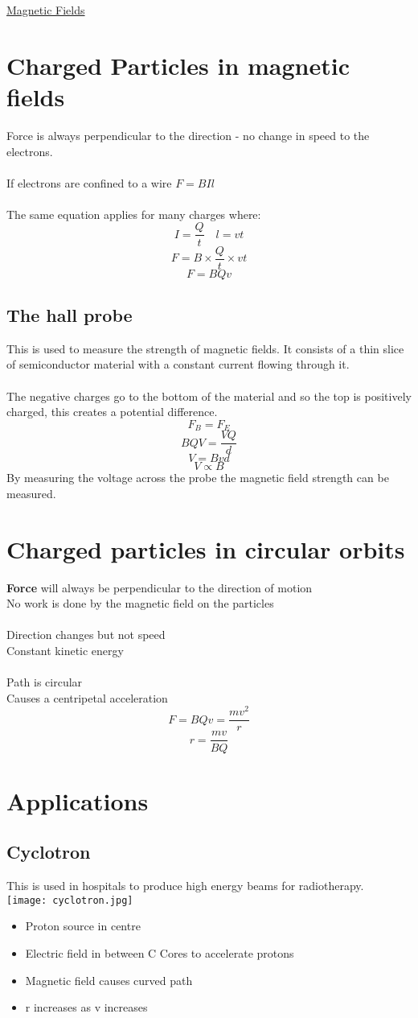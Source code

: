 \documentclass{article}[18pt]
\begin{document}
\begin{center}
\underline{\huge Magnetic Fields}
\end{center}
\section{Charged Particles in magnetic fields}
Force is always perpendicular to the direction - no change in speed to the electrons.\\
\\
If electrons are confined to a wire $F=BIl$\\
\\
The same equation applies for many charges where:
$$I=\frac{Q}{t} \quad l=vt$$
$$F=B\times\frac{Q}{t}\times vt$$
$$F=BQv$$
\subsection{The hall probe}
This is used to measure the strength of magnetic fields. It consists of a thin slice of semiconductor material with a constant current flowing through it.\\
\\
The negative charges go to the bottom of the material and so the top is positively charged, this creates a potential difference.
$$F_B=F_E$$
$$BQV=\frac{VQ}{d}$$
$$V=Bvd$$
$$V\propto B$$
By measuring the voltage across the probe the magnetic field strength can be measured.
\section{Charged particles in circular orbits}
\textbf{Force} will always be perpendicular to the direction of motion\\
No work is done by the magnetic field on the particles\\
\\
Direction changes but not speed\\
Constant kinetic energy\\
\\
Path is circular\\
Causes a centripetal acceleration\\
$$F=BQv=\dfrac{mv^2}{r}$$
$$r=\dfrac{mv}{BQ}$$
\newpage
\section{Applications}
\subsection{Cyclotron}
This is used in hospitals to produce high energy beams for radiotherapy.\\
\texttt{[image: cyclotron.jpg]}\\
\begin{itemize}
\item Proton source in centre
\item Electric field in between C Cores to accelerate protons
\item Magnetic field causes curved path
\item r increases as v increases
\end{itemize}
\end{document}
